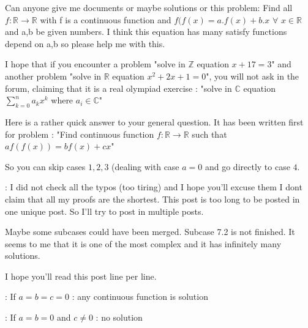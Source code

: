 \begin{solution}
	\begin{tcolorbox}Can anyone give me documents or maybe solutions or this problem: 
Find all $f:\mathbb{R}\rightarrow\mathbb{R}$ with f is a continuous function and $ f(f(x) = a. f(x) + b.x$ $\forall$ $x\in\mathbb{R}$ and a,b be given numbers.
I think this equation has many satisfy functions depend on a,b so please help me with this.\end{tcolorbox}
I hope that if you encounter a problem "solve in $\mathbb Z$ equation $x+17=3$" and another problem "solve in $\mathbb R$ equation $x^2+2x+1=0$", you will not ask in the forum, claiming that it is a real olympiad exercise : "solve in $\mathbb C$ equation $\sum_{k=0}^na_kx^k$ where $a_i\in\mathbb C$"

Here is a rather quick answer to your general question. It has been written first for problem :
"Find continuous function $f:\mathbb{R} \to \mathbb{R}$ such that
$a f(f(x)) = b f(x) + cx$"

So you can skip cases $1,2,3$ (dealing with case $a=0$ and go directly to case $4$.

 :
I did not check all the typos (too tiring) and I hope you'll excuse them
I dont claim that all my proofs are the shortest.
This post is too long to be posted in one unique post. So I'll try to post in multiple posts.

Maybe some subcases could have been merged.
Subcase 7.2 is not finished. It seems to me that it is one of the most complex and it has infinitely many solutions.

I hope you'll read this post line per line.


 : If $a=b=c=0$ : any continuous function is solution

 : If $a=b=0$ and $c\ne 0$ : no solution


\end{solution}
